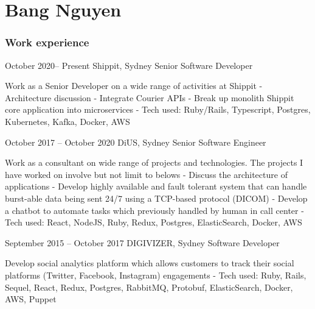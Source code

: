 \documentclass{tccv}
\begin{document}
\part{Bang Nguyen}

\section{Work experience}

\begin{eventlist}

\item{October 2020-- Present}
    {Shippit, Sydney}
    {Senior Software Developer}

    Work as a Senior Developer on a wide range of activities at Shippit
    \newline- Architecture discussion
    \newline- Integrate Courier APIs
    \newline- Break up monolith Shippit core application into microservices
    \newline- Tech used: Ruby/Rails, Typescript, Postgres, Kubernetes, Kafka, Docker, AWS

\item{October 2017 -- October 2020}
    {DiUS, Sydney}
    {Senior Software Engineer}

    Work as a consultant on wide range of projects and technologies. The projects
    I have worked on involve but not limit to belows
    \newline- Discuss the architecture of applications
    \newline- Develop highly available and fault tolerant system that can handle
    burst-able data being sent 24/7 using a TCP-based protocol (DICOM)
    \newline- Develop a chatbot to automate tasks which previously handled by
    human in call center
    \newline- Tech used: React, NodeJS, Ruby, Redux, Postgres, ElasticSearch, Docker, AWS

\item{September 2015 -- October 2017}
    {DIGIVIZER, Sydney}
    {Software Developer}

    Develop social analytics platform which allows customers to track their
    social platforms (Twitter, Facebook, Instagram) engagements
    \newline- Tech used: Ruby, Rails, Sequel, React, Redux, Postgres, RabbitMQ,
    Protobuf, ElasticSearch, Docker, AWS, Puppet


\end{eventlist}
\end{document}
